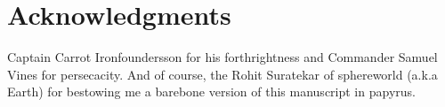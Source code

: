 \chapter[Acknowledgments]{\centering Acknowledgments}

Captain Carrot Ironfoundersson for his forthrightness and Commander Samuel Vines for persecacity. And of course, the Rohit Suratekar of sphereworld (a.k.a Earth) for bestowing me a barebone version of this manuscript in papyrus.

